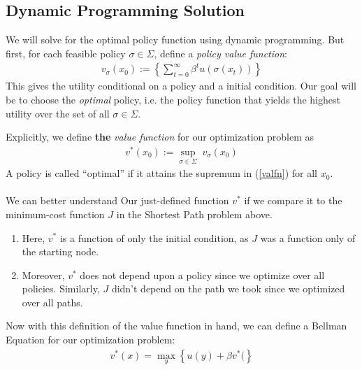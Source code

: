 \documentclass[a4paper,12pt]{scrartcl}
\begin{document}
\subsection{Dynamic Programming Solution}

We will solve for the optimal policy function using dynamic
programming. But first, for each feasible policy $\sigma\in
\Sigma$, define a \emph{policy value
function}:
\begin{align*}
  v_\sigma(x_0) :=
  \left\{ \sum^\infty_{t=0} \beta^t u(\sigma(x_t)) \right\}
\end{align*}
This gives the utility conditional on a policy and a initial
condition.  Our goal will be to choose the \emph{optimal}
policy, i.e. the policy function that yields the highest utility
over the set of all $\sigma \in \Sigma$.

Explicitly, we define \textbf{the} \emph{value function} for
our optimization problem as 
\begin{align}
  \label{valfn}
  v^*(x_0) := \sup_{\sigma\in\Sigma} \; v_\sigma(x_0)
\end{align}
A policy is called ``optimal'' if it attains the supremum in
(\ref{valfn}) for all $x_0$. 
\\
\\
We can better understand Our just-defined function $v^*$ if we
compare it to the minimum-cost function $J$ in the Shortest Path
problem above.
\begin{enumerate}
  \item Here, $v^*$ is a function of only the initial condition,
    as $J$ was a function only of the starting node.
  \item Moreover, $v^*$ does not depend upon a policy since we
    optimize over all policies. Similarly, $J$ didn't depend on
    the path we took since we optimized over all paths.
\end{enumerate}

Now with this definition of the value function in hand, we can
define a Bellman Equation for our optimization problem: 
\begin{align*}
  v^*(x) = \max_{y} \left\{ u(y) + \beta v^*( \right\}
\end{align*}










% 
\end{document}

